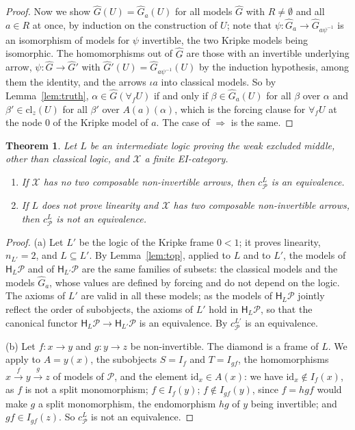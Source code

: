 \documentclass[11pt]{amsart}
\newtheorem{thm}{Theorem}[section]
\theoremstyle{definition}
\newcommand{\HH}{\mathsf H}
\newcommand{\cX}{\mathcal X}
\newcommand{\cP}{\mathcal P}
\newcommand{\id}{\mathrm{id}}
\begin{document}
\begin{proof}
Now we show $\hat G(U)=\hat G_a(U)$ for all models $\hat G$ with
$R\ne\emptyset$ and all $a\in R$ at once, by induction on the
construction of $U$; note that $\psi\colon\hat G_a\to\hat G_{a\psi^{-1}}$
is an isomorphism of models for $\psi$ invertible, the two Kripke
models being isomorphic. The homomorphisms out of $\hat G$ are those
with an invertible underlying arrow, $\psi\colon\hat G\to\hat G'$ with $\hat G'(U)=\hat
G_{a\psi^{-1}}(U)$ by the induction hypothesis, among them the
identity, and the arrows $\iota a$ into classical models. So by
Lemma~\ref{lem:truth}, $\alpha\in\hat G(\forall_fU)$ if and only if
$\beta\in\hat G_a(U)$ for all $\beta$ over $\alpha$ and $\beta'\in
\mathrm{cl}_z(U)$ for all $\beta'$ over $A(a)(\alpha)$, which is the
forcing clause for $\forall_fU$ at the node $0$ of the Kripke model of
$a$. The case of $\Rightarrow$ is the same.
\end{proof}

\begin{thm}\label{thm:wem}
Let $L$ be an intermediate logic proving the weak excluded middle,
other than classical logic, and $\cX$ a finite EI-category.
\begin{enumerate}
\item[(a)] If $\cX$ has no two composable non-invertible arrows, then
$c^L_\cP$ is an equivalence.
\item[(b)] If $L$ does not prove linearity and $\cX$ has two composable
non-invertible arrows, then $c^L_\cP$ is not an equivalence.
\end{enumerate}
\end{thm}
\begin{proof}
(a) Let $L'$ be the logic of the Kripke frame $0<1$; it proves linearity,
$n_{L'}=2$, and $L\subseteq L'$. By Lemma~\ref{lem:top}, applied to $L$
and to $L'$, the models of $\HH_L\cP$ and of $\HH_{L'}\cP$ are the same
families of subsets: the classical models and the models $\hat G_a$,
whose values are defined by forcing and do not depend on the logic.
The axioms of $L'$ are valid in all these models; as the models of
$\HH_L\cP$ jointly reflect the order of subobjects, the axioms of $L'$
hold in $\HH_L\cP$, so that the canonical functor $\HH_L\cP\to
\HH_{L'}\cP$ is an equivalence. By
\cite[Cor.~6.3]{Strings} $c^{L'}_\cP$ is an equivalence.

(b) Let $f\colon x\to y$ and $g\colon y\to z$ be non-invertible. The
diamond is a frame of $L$. We apply \cite[Prop.~5.1]{Interm} to
$A=y(x)$, the subobjects $S=I_f$ and $T=I_{gf}$, the homomorphisms
$x\xrightarrow{f}y\xrightarrow{g}z$ of models of $\cP$, and the element
$\id_x\in A(x)$: we have $\id_x\notin I_f(x)$, as $f$ is not a split
monomorphism; $f\in I_f(y)$; $f\notin I_{gf}(y)$, since $f=hgf$ would
make $g$ a split monomorphism, the endomorphism $hg$ of $y$ being
invertible; and $gf\in I_{gf}(z)$. So $c^L_\cP$ is not an equivalence.
\end{proof}
\end{document}
